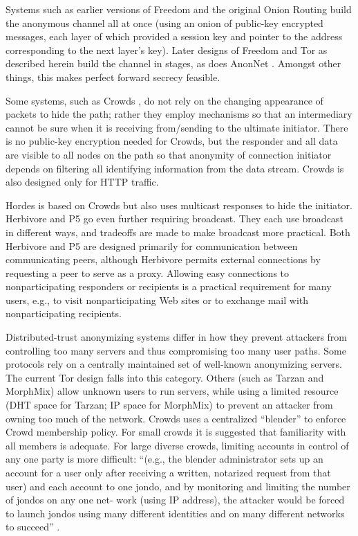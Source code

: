 \documentclass[times,10pt,twocolumn]{article}
\begin{document}
Systems such as earlier versions of Freedom and the original Onion Routing
build the anonymous channel all at once (using an onion of public-key
encrypted messages, each layer of which provided a session key and pointer
to the address corresponding to the next layer's key). 
Later designs of Freedom and Tor as described herein build
the channel in stages, as does AnonNet
\cite{anonnet}. Amongst other things, this makes perfect forward
secrecy feasible.

Some systems, such as Crowds \cite{crowds-tissec}, do not rely on the
changing appearance of packets to hide the path; rather they employ
mechanisms so that an intermediary cannot be sure when it is
receiving from/sending to the ultimate initiator. There is no public-key
encryption needed for Crowds, but the responder and all data are
visible to all nodes on the path so that anonymity of connection
initiator depends on filtering all identifying information from the
data stream. Crowds is also designed only for HTTP traffic.

Hordes \cite{hordes-jcs} is based on Crowds but also uses multicast
responses to hide the initiator. Herbivore \cite{herbivore} and
P5 \cite{p5} go even further requiring broadcast.
They each use broadcast in different ways, and tradeoffs are made to
make broadcast more practical. Both Herbivore and P5 are designed primarily
for communication between communicating peers, although Herbivore
permits external connections by requesting a peer to serve as a proxy.
Allowing easy connections to nonparticipating responders or recipients
is a practical requirement for many users, e.g., to visit
nonparticipating Web sites or to exchange mail with nonparticipating
recipients.

Distributed-trust anonymizing systems differ in how they prevent attackers
from controlling too many servers and thus compromising too many user paths.
Some protocols rely on a centrally maintained set of well-known anonymizing
servers.  The current Tor design falls into this category.
Others (such as Tarzan and MorphMix) allow unknown users to run
servers, while using a limited resource (DHT space for Tarzan; IP space for
MorphMix) to prevent an attacker from owning too much of the network.
Crowds uses a centralized ``blender'' to enforce Crowd membership
policy. For small crowds it is suggested that familiarity with all
members is adequate. For large diverse crowds, limiting accounts in
control of any one party is more difficult: 
``(e.g., the blender administrator sets up an account for a user only
after receiving a written, notarized request from that user) and each
account to one jondo, and by monitoring and limiting the number of
jondos on any one net- work (using IP address), the attacker would be
forced to launch jondos using many different identities and on many
different networks to succeed'' \cite{crowds-tissec}.
\end{document}
